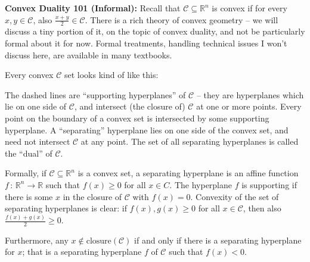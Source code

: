 \documentclass[11pt]{article}
\newcommand{\R}{\mathbb{R}} %
\newcommand{\cC}{\mathcal{C}}
\begin{document}
\begin{tcolorbox}[colback=white, colframe=black, width=\textwidth, boxrule=0.5mm]
\textbf{Convex Duality 101 (Informal):}
Recall that $\cC \subseteq \R^n$ is convex if for every $x,y \in \cC$, also $\tfrac{x+y}{2} \in \cC$.
There is a rich theory of convex geometry -- we will discuss a tiny portion of it, on the topic of 
convex duality, and not be particularly formal about it for now.
Formal treatments, handling technical issues I won't discuss here, are available in many textbooks.

\vspace{0.5em}

Every convex $\cC$ set looks kind of like this:

\begin{center}

\end{center}

The dashed lines are ``supporting hyperplanes''  of $\cC$ -- they are hyperplanes which lie on one side of $\cC$, and intersect (the closure of) $\cC$ at one or more points.
Every point on the boundary of a convex set is intersected by some supporting hyperplane. 
A ``separating'' hyperplane lies on one side of the convex set, and need not intersect $\cC$ at any point.
The set of all separating hyperplanes is called the ``dual'' of $\cC$.

\vspace{0.5em}

Formally, if $\cC \subseteq \R^n$ is a convex set, a separating hyperplane is an affine function $f \, : \, \R^n \rightarrow \R$ such that $f(x) \geq 0$ for all $x \in C$.
The hyperplane $f$ is supporting if there is some $x$ in the closure of $\cC$ with $f(x) = 0$.
Convexity of the set of separating hyperplanes is clear: if $f(x), g(x) \geq 0$ for all $x \in \cC$, then also $\tfrac{f(x) + g(x)}{2} \geq 0$.

\vspace{0.5em}

Furthermore, any $x \notin \text{closure}(\cC)$ if and only if there is a separating hyperplane for $x$; that is a separating hyperplane $f$ of $\cC$ such that $f(x) < 0$.
\end{tcolorbox}
\end{document}

